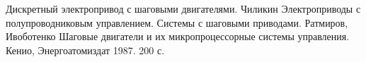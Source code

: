 \newpage
\begin{thebibliography}{20}
 Дискретный электропривод с шаговыми двигателями. Чиликин
 Электроприводы с полупроводниковым управлением. Системы с шаговыми
приводами. Ратмиров, Ивоботенко
 Шаговые двигатели и их микропроцессорные системы управления. Кенио,
Энергоатомиздат 1987. 200 с.
\end{thebibliography}
